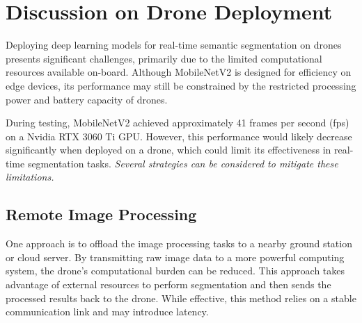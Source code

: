 \documentclass[a4paper]{article}
\begin{document}
    
    

\section{Discussion on Drone Deployment}

Deploying deep learning models for real-time semantic segmentation on drones presents significant challenges, primarily due to the limited computational resources available on-board. Although MobileNetV2 is designed for efficiency on edge devices, its performance may still be constrained by the restricted processing power and battery capacity of drones.

During testing, MobileNetV2 achieved approximately 41 frames per second (fps) on a Nvidia RTX 3060 Ti GPU. However, this performance would likely decrease significantly when deployed on a drone, which could limit its effectiveness in real-time segmentation tasks. \textit{Several strategies can be considered to mitigate these limitations.}

\subsection{Remote Image Processing}

One approach is to offload the image processing tasks to a nearby ground station or cloud server. By transmitting raw image data to a more powerful computing system, the drone’s computational burden can be reduced. This approach takes advantage of external resources to perform segmentation and then sends the processed results back to the drone. While effective, this method relies on a stable communication link and may introduce latency.
\end{document}
